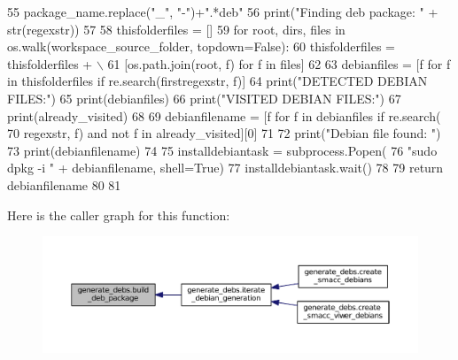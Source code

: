 \begin{DoxyCode}
55         package\_name.replace(\textcolor{stringliteral}{"\_"}, \textcolor{stringliteral}{"-"})+\textcolor{stringliteral}{".*deb"}
56     print(\textcolor{stringliteral}{"Finding deb package: "} + str(regexstr))
57 
58     thisfolderfiles = []
59     \textcolor{keywordflow}{for} root, dirs, files \textcolor{keywordflow}{in} os.walk(workspace\_source\_folder, topdown=\textcolor{keyword}{False}):
60         thisfolderfiles = thisfolderfiles + \(\backslash\)
61             [os.path.join(root, f) \textcolor{keywordflow}{for} f \textcolor{keywordflow}{in} files]
62 
63     debianfiles = [f \textcolor{keywordflow}{for} f \textcolor{keywordflow}{in} thisfolderfiles \textcolor{keywordflow}{if} re.search(firstregexstr, f)]
64     print(\textcolor{stringliteral}{"DETECTED DEBIAN FILES:"})
65     print(debianfiles)
66     print(\textcolor{stringliteral}{"VISITED DEBIAN FILES:"})
67     print(already\_visited)
68 
69     debianfilename = [f \textcolor{keywordflow}{for} f \textcolor{keywordflow}{in} debianfiles \textcolor{keywordflow}{if} re.search(
70         regexstr, f) \textcolor{keywordflow}{and} \textcolor{keywordflow}{not} f \textcolor{keywordflow}{in} already\_visited][0]
71 
72     print(\textcolor{stringliteral}{"Debian file found: "})
73     print(debianfilename)
74 
75     installdebiantask = subprocess.Popen(
76         \textcolor{stringliteral}{"sudo dpkg -i "} + debianfilename, shell=\textcolor{keyword}{True})
77     installdebiantask.wait()
78 
79     \textcolor{keywordflow}{return} debianfilename
80 
81 
\end{DoxyCode}


Here is the caller graph for this function\+:
\nopagebreak
\begin{figure}[H]
\begin{center}
\leavevmode
\includegraphics[width=350pt]{namespacegenerate__debs_aa70c3f4917ddc57b13eaed8501f571a8_icgraph}
\end{center}
\end{figure}


